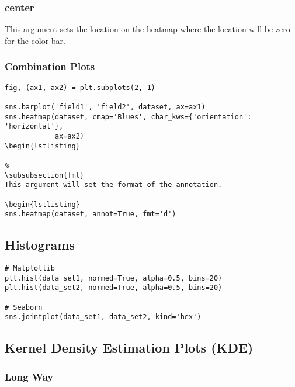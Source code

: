 %
\subsubsection{center}
This argument sets the location on the heatmap where the location will be zero
for the color bar.

%
\subsubsection{Combination Plots}

\begin{lstlisting}
fig, (ax1, ax2) = plt.subplots(2, 1)

sns.barplot('field1', 'field2', dataset, ax=ax1)
sns.heatmap(dataset, cmap='Blues', cbar_kws={'orientation': 'horizontal'},
            ax=ax2)
\begin{lstlisting}

%
\subsubsection{fmt}
This argument will set the format of the annotation.

\begin{lstlisting}
sns.heatmap(dataset, annot=True, fmt='d')
\end{lstlisting}

\subsection{Histograms}

\begin{lstlisting}
# Matplotlib
plt.hist(data_set1, normed=True, alpha=0.5, bins=20)
plt.hist(data_set2, normed=True, alpha=0.5, bins=20)

# Seaborn
sns.jointplot(data_set1, data_set2, kind='hex')
\end{lstlisting}

\subsection{Kernel Density Estimation Plots (KDE)}

\subsubsection{Long Way}

